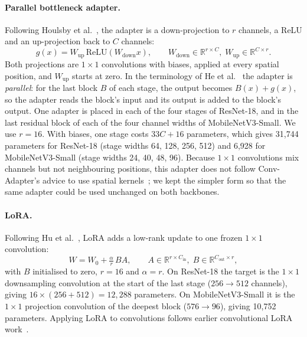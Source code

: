 \paragraph{Parallel bottleneck adapter.} Following Houlsby et al.~\cite{houlsby2019adapters}, the
adapter is a down-projection to $r$ channels, a ReLU and an up-projection back to $C$ channels:
\begin{equation}
g(x) = W_{\text{up}}\, \mathrm{ReLU}(W_{\text{down}} x), \qquad W_{\text{down}} \in \mathbb{R}^{r \times C},\;
W_{\text{up}} \in \mathbb{R}^{C \times r}.
\end{equation}
Both projections are $1 \times 1$ convolutions with biases, applied at every spatial position, and
$W_{\text{up}}$ starts at zero. In the terminology of He et al.~\cite{he2022unified} the adapter is
\emph{parallel}: for the last block $B$ of each stage, the output becomes $B(x) + g(x)$, so the adapter
reads the block's input and its output is added to the block's output. One adapter is placed in each of
the four stages of ResNet-18, and in the last residual block of each of the four channel widths of
MobileNetV3-Small. We use $r = 16$. With biases, one stage costs $33C + 16$ parameters, which gives
31,744 parameters for ResNet-18 (stage widths 64, 128, 256, 512) and 6,928 for MobileNetV3-Small (stage
widths 24, 40, 48, 96). Because $1\times1$ convolutions mix channels but not neighbouring positions,
this adapter does not follow Conv-Adapter's advice to use spatial kernels~\cite{chen2024convadapter}; we
kept the simpler form so that the same adapter could be used unchanged on both backbones.

\paragraph{LoRA.} Following Hu et al.~\cite{hu2022lora}, LoRA adds a low-rank update to one frozen
$1 \times 1$ convolution:
\begin{equation}
W = W_0 + \tfrac{\alpha}{r}\, B A, \qquad A \in \mathbb{R}^{r \times C_{\text{in}}},\; B \in
\mathbb{R}^{C_{\text{out}} \times r},
\end{equation}
with $B$ initialised to zero, $r = 16$ and $\alpha = r$. On ResNet-18 the target is the $1\times1$
downsampling convolution at the start of the last stage ($256 \to 512$ channels), giving
$16 \times (256 + 512) = 12{,}288$ parameters. On MobileNetV3-Small it is the $1\times1$ projection
convolution of the deepest block ($576 \to 96$), giving 10,752 parameters. Applying LoRA to
convolutions follows earlier convolutional LoRA work~\cite{aleem2024convlora,zhong2024convlora}.

